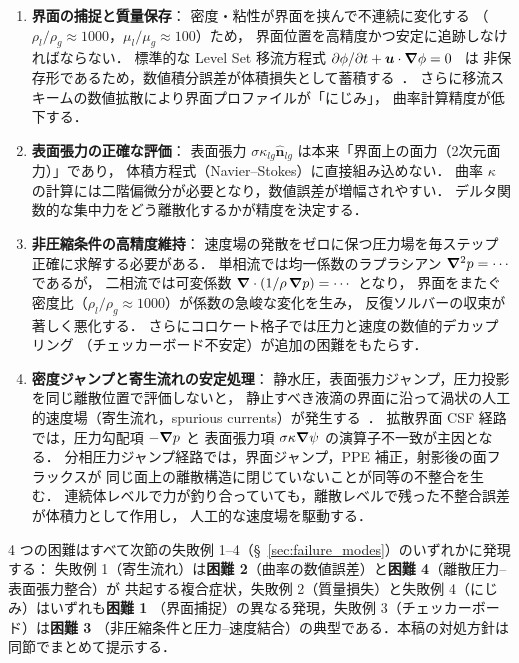 \begin{enumerate}
  \item \textbf{界面の捕捉と質量保存}：
        密度・粘性が界面を挟んで不連続に変化する
        （$\rho_l/\rho_g \approx 1000$，$\mu_l/\mu_g \approx 100$）ため，
        界面位置を高精度かつ安定に追跡しなければならない．
        標準的な Level Set 移流方程式 $\partial\phi/\partial t + \bm{u}\cdot\bm{\nabla}\phi = 0$~\cite{OsherSethian1988} は
        非保存形であるため，数値積分誤差が体積損失として蓄積する~\cite{Sussman1999}．
        さらに移流スキームの数値拡散により界面プロファイルが「にじみ」，
        曲率計算精度が低下する．

  \item \textbf{表面張力の正確な評価}：
        表面張力 $\sigma\kappa_{lg}\hat{\bm n}_{lg}$ は本来「界面上の面力（2次元面力）」であり，
        体積方程式（Navier--Stokes）に直接組み込めない．
        曲率 $\kappa$ の計算には二階偏微分が必要となり，数値誤差が増幅されやすい．
        デルタ関数的な集中力をどう離散化するかが精度を決定する．

  \item \textbf{非圧縮条件の高精度維持}：
        速度場の発散をゼロに保つ圧力場を毎ステップ正確に求解する必要がある．
        単相流では均一係数のラプラシアン $\bm{\nabla}^2 p = \cdots$ であるが，
        二相流では可変係数 $\bm{\nabla}\cdot(1/\rho\,\bm{\nabla} p) = \cdots$ となり，
        界面をまたぐ密度比（$\rho_l/\rho_g \approx 1000$）が係数の急峻な変化を生み，
        反復ソルバーの収束が著しく悪化する．
        さらにコロケート格子では圧力と速度の数値的デカップリング
        （チェッカーボード不安定）が追加の困難をもたらす．

  \item \textbf{密度ジャンプと寄生流れの安定処理}：
        静水圧，表面張力ジャンプ，圧力投影を同じ離散位置で評価しないと，
        静止すべき液滴の界面に沿って渦状の人工的速度場（寄生流れ，spurious currents）が発生する~\cite{Francois2006, Sussman2000}．
        拡散界面 CSF 経路では，圧力勾配項 $-\bm{\nabla} p$ と
        表面張力項 $\sigma\kappa\bm{\nabla}\psi$ の演算子不一致が主因となる．
        分相圧力ジャンプ経路では，界面ジャンプ，PPE 補正，射影後の面フラックスが
        同じ面上の離散構造に閉じていないことが同等の不整合を生む．
        連続体レベルで力が釣り合っていても，離散レベルで残った不整合誤差が体積力として作用し，
        人工的な速度場を駆動する．
\end{enumerate}

4 つの困難はすべて次節の失敗例 1--4（§~\ref{sec:failure_modes}）のいずれかに発現する：
失敗例 1（寄生流れ）は\textbf{困難 2}（曲率の数値誤差）と\textbf{困難 4}（離散圧力--表面張力整合）が
共起する複合症状，失敗例 2（質量損失）と失敗例 4（にじみ）はいずれも\textbf{困難 1}
（界面捕捉）の異なる発現，失敗例 3（チェッカーボード）は\textbf{困難 3}
（非圧縮条件と圧力--速度結合）の典型である．本稿の対処方針は同節でまとめて提示する．

